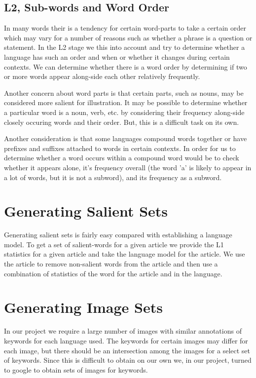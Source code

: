 \documentclass[12pt]{article}
\begin{document}
\subsection{L2, Sub-words and Word Order}
In many words their is a tendency for certain word-parts to take a certain order which may vary for a number of reasons such as whether a phrase is a question or statement. In the L2 stage we this into account and try to determine whether a language has such an order and when or whether it changes during certain contexts. We can determine whether there is a word order by determining if two or more words appear along-side each other relatively frequently.

Another concern about word parts is that certain parts, such as nouns, may be considered more salient for illustration. It may be possible to determine whether a particular word is a noun, verb, etc. by considering their frequency along-side closely occuring words and their order. But, this is a difficult task on its own.

Another consideration is that some languages compound words together or have prefixes and suffixes attached to words in certain contexts. 
In order for us to determine whether a word occurs within a compound word would be to check whether it appears alone, 
it's frequency overall (the word 'a' is likely to appear in a lot of words, but it is not a subword), and its frequency as a subword.

\section{Generating Salient Sets}
Generating salient sets is fairly easy compared with establishing a language model. To get a set of salient-words for a given article we provide the L1 statistics for a given article and take the language model for the article. We use the article to remove non-salient words from the article and then use a combination of statistics of the word for the article and in the language.

\section{Generating Image Sets}
In our project we require a large number of images with similar annotations of keywords for each language used. The keywords for certain images may differ for each image, but there should be an intersection among the images for a select set of keywords. Since this is difficult to obtain on our own we, in our project, turned to google to obtain sets of images for keywords.
\end{document}
